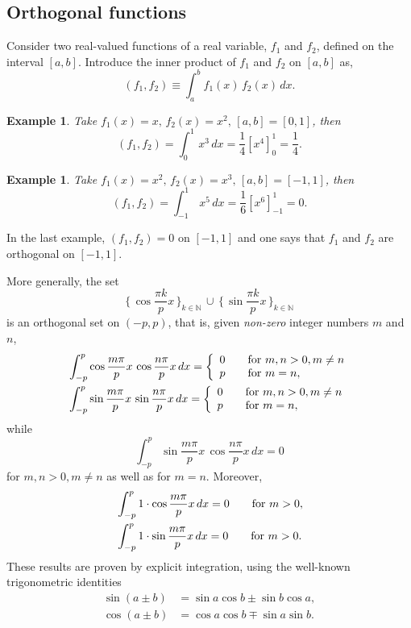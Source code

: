 \documentclass[12pt]{article}
\numberwithin{equation}{section}
\newtheorem{example}[theorem]{Example}
\begin{document}
\subsection{Orthogonal functions}
Consider two real-valued functions of a real variable, $f_1$ and $f_2$, defined
on the interval $[a,b]$. Introduce the inner product of $f_1$ and $f_2$
on $[a,b]$ as,
\[
(f_1,f_2) \equiv \int_a^b f_1(x)\,f_2(x)\,dx.
\]
\begin{example}
\normalfont
Take $f_1(x)=x,\,f_2(x)=x^2,\,[a,b]=[0,1]$, then
\[
(f_1,f_2)=\int_0^1\,x^3 \,dx = \frac{1}{4}[x^4]_0^1=\frac{1}{4}.
\]
\end{example}
\begin{example}
\normalfont
Take $f_1(x)=x^2,\,f_2(x)=x^3,\,[a,b]=[-1,1]$, then
\[
(f_1,f_2)=\int_{-1}^1\, x^5 \,dx = \frac{1}{6}[x^6]_{-1}^1=0.
\]
\end{example}

In the last example, $(f_1,f_2)=0$ on $[-1,1]$ and one says that $f_1$ and
$f_2$ are orthogonal  on $[-1,1]$.

More generally, the set 
\begin{equation} \label{ortho}
\{\,\cos \frac{\pi k}{p}x\,\}_{k \in \mathbb{N}}\,\cup\,\{\,\sin \frac{\pi k}{p}x\,\}_{k \in \mathbb{N}}
\end{equation}
is an orthogonal set on $(-p,p)$, that is, given {\em non-zero}
integer numbers $m$ and $n$,
\begin{align}
&\int_{-p}^p\cos \frac{m\pi}{p}x\,\cos \frac{n\pi}{p}x\,dx=
\left \{ \begin{array}{l}
0\qquad {\rm for}\,\,m,n > 0, m \neq n\\
p \qquad {\rm for}\,\,m=n,\end{array} \right. \label{coscos}\\ 
&\int_{-p}^p\sin \frac{m\pi}{p}x\,\sin \frac{n\pi}{p}x\,dx=
\left \{ \begin{array}{l}
0\qquad
{\rm for}\,\,m,n > 0, m \neq n\\
p \qquad {\rm for}\,\,m=n,\end{array} \right. \label{sinsin}
\end{align}
while
\begin{equation}
\int_{-p}^p \sin \frac{m\pi}{p}x\,\cos \frac{n\pi}{p}x\,dx=0
\label{sincos}
\end{equation}
 for\,\,$m,n > 0, m \neq n$ as well as for $m=n$. Moreover,
\begin{align}
&\int_{-p}^p 1 \cdot \cos \frac{m\pi}{p}x\,dx=0\qquad
{\rm for}\,\,m> 0,  \label{1cos}\\
&\int_{-p}^p 1 \cdot \sin \frac{m\pi}{p}x\,dx=0\qquad
{\rm for}\,\,m> 0.\label{1sin}
\end{align}
These results are proven by explicit integration, using the well-known
trigonometric identities 
\begin{align*}
\sin(a\pm b)&=\sin a \cos b \pm \sin b \cos a,\\
\cos(a\pm b)&=\cos a \cos b \mp \sin a \sin b.
\end{align*}
\end{document}
